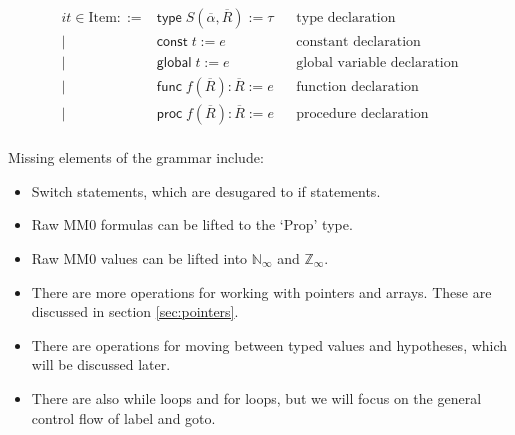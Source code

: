 \documentclass[acmsmall,nonacm]{acmart}
\newcommand*{\N}{\mathbb{N}}
\newcommand*{\Z}{\mathbb{Z}}
\begin{document}
\begin{align*}
  it \in \mathrm{Item} ::={}&\mathsf{type}\;S(\overline{\alpha}, \overline{R}):=\tau&&\mbox{type declaration}\\
    \mid{}&\mathsf{const}\;t:=e&&\mbox{constant declaration}\\
    \mid{}&\mathsf{global}\;t:=e&&\mbox{global variable declaration}\\
    \mid{}&\mathsf{func}\;f(\overline{R}):\overline{R}:=e&&\mbox{function declaration}\\
    \mid{}&\mathsf{proc}\;f(\overline{R}):\overline{R}:=e&&\mbox{procedure declaration}\\
\end{align*}

Missing elements of the grammar include:
\begin{itemize}
  \item Switch statements, which are desugared to if statements.
  \item Raw MM0 formulas can be lifted to the `Prop' type.
  \item Raw MM0 values can be lifted into $\N_\infty$ and $\Z_\infty$.
  \item There are more operations for working with pointers and arrays. These are discussed in section \ref{sec:pointers}.
  \item There are operations for moving between typed values and hypotheses, which will be discussed later.
  \item There are also \textsf{while} loops and \textsf{for} loops, but we will focus on the general control flow of \textsf{label} and \textsf{goto}.
\end{itemize}
\end{document}
